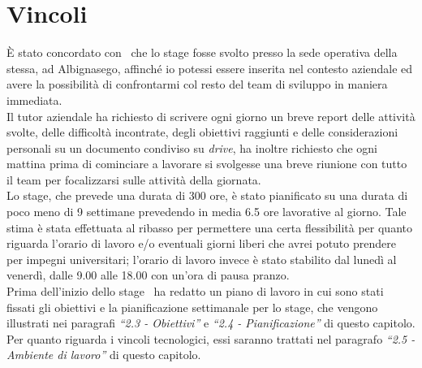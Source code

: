 \section{Vincoli}
È stato concordato con \TS\ che lo stage fosse svolto presso la sede operativa della stessa, ad Albignasego, affinché io potessi essere inserita nel contesto aziendale ed avere la possibilità di confrontarmi col resto del team di sviluppo in maniera immediata. \\
Il tutor aziendale ha richiesto di scrivere ogni giorno un breve report delle attività svolte, delle difficoltà incontrate, degli obiettivi raggiunti e delle considerazioni personali su un documento condiviso su \emph{\gls{drive}}\glsfirstoccur, ha inoltre richiesto che ogni mattina prima di cominciare a lavorare si svolgesse una breve riunione con tutto il team per focalizzarsi sulle attività della giornata.\\
Lo stage, che prevede una durata di 300 ore, è stato pianificato su una durata di poco meno di 9 settimane prevedendo in media 6.5 ore lavorative al giorno. Tale stima è stata effettuata al ribasso per permettere una certa flessibilità per quanto riguarda l'orario di lavoro e/o eventuali giorni liberi che avrei potuto prendere per impegni universitari; l'orario di lavoro invece è stato stabilito dal lunedì al venerdì, dalle 9.00 alle 18.00 con un'ora di pausa pranzo. \\
Prima dell'inizio dello stage \TS\ ha redatto un piano di lavoro in cui sono stati fissati gli obiettivi e la pianificazione settimanale per lo stage, che vengono illustrati nei paragrafi \textit{``2.3 - Obiettivi''} e \textit{``2.4 - Pianificazione''} di questo capitolo. \\
Per quanto riguarda i vincoli tecnologici, essi saranno trattati nel paragrafo \textit{``2.5 - Ambiente di lavoro''} di questo capitolo.
